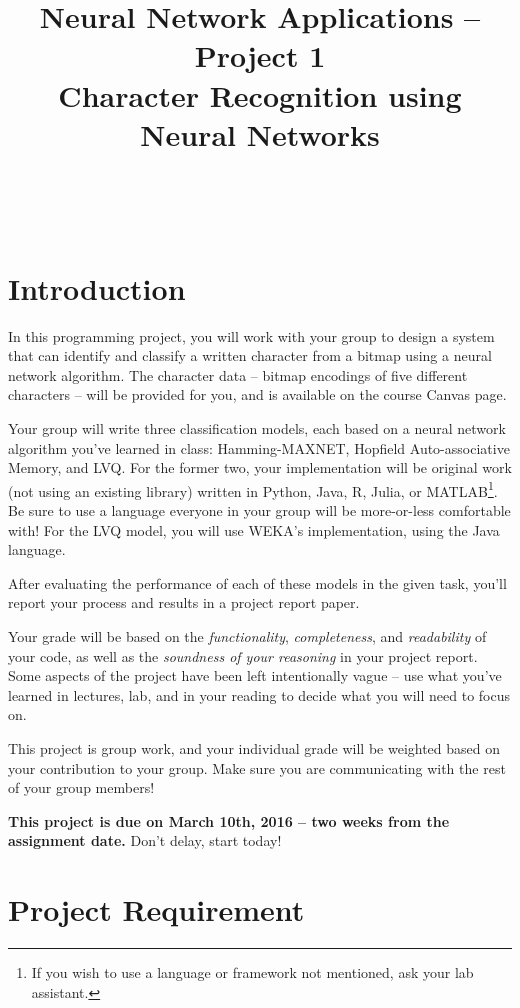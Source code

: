 \documentclass[11pt]{cselabheader}
\title{Neural Network Applications -- Project 1 \\ Character Recognition using Neural Networks}
\begin{document}
\maketitle

\horrule{0.5pt}\\\horrule{2pt}

\section{Introduction}

In this programming project, you will work with your group to design a system that can identify and classify a written character from a bitmap using a neural network algorithm. The character data -- bitmap encodings of five different characters -- will be provided for you, and is available on the course Canvas page.

Your group will write three classification models, each based on a neural network algorithm you've learned in class: Hamming-MAXNET, Hopfield Auto-associative Memory, and LVQ. For the former two, your implementation will be original work (not using an existing library) written in Python, Java, R, Julia, or MATLAB\footnote{If you wish to use a language or framework not mentioned, ask your lab assistant.}. Be sure to use a language everyone in your group will be more-or-less comfortable with! For the LVQ model, you will use WEKA's implementation, using the Java language.

After evaluating the performance of each of these models in the given task, you'll report your process and results in a project report paper.

Your grade will be based on the \textit{functionality}, \textit{completeness}, and \textit{readability} of your code, as well as the \textit{soundness of your reasoning} in your project report. Some aspects of the project have been left intentionally vague -- use what you've learned in lectures, lab, and in your reading to decide what you will need to focus on.

This project is group work, and your individual grade will be weighted based on your contribution to your group. Make sure you are communicating with the rest of your group members!

\textbf{This project is due on March 10th, 2016 -- two weeks from the assignment date.} Don't delay, start today!

\pagebreak

\section{Project Requirement}
\end{document}
